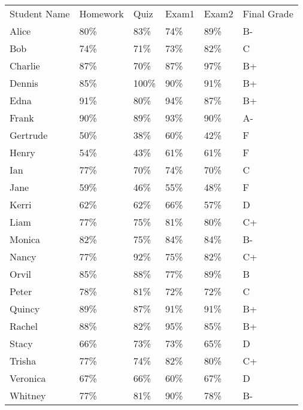 \documentclass{article}
\begin{document}
\begin{tabular}{l | l | l | l | l | l}
Student Name & Homework & Quiz & Exam1 & Exam2 & Final Grade \\ 
Alice & 80\% & 83\% & 74\% & 89\% & B- \\ 
Bob & 74\% & 71\% & 73\% & 82\% & C \\ 
Charlie & 87\% & 70\% & 87\% & 97\% & B+ \\ 
Dennis & 85\% & 100\% & 90\% & 91\% & B+ \\ 
Edna & 91\% & 80\% & 94\% & 87\% & B+ \\ 
Frank & 90\% & 89\% & 93\% & 90\% & A- \\ 
Gertrude & 50\% & 38\% & 60\% & 42\% & F \\ 
Henry & 54\% & 43\% & 61\% & 61\% & F \\ 
Ian & 77\% & 70\% & 74\% & 70\% & C \\ 
Jane & 59\% & 46\% & 55\% & 48\% & F \\ 
Kerri & 62\% & 62\% & 66\% & 57\% & D \\ 
Liam & 77\% & 75\% & 81\% & 80\% & C+ \\ 
Monica & 82\% & 75\% & 84\% & 84\% & B- \\ 
Nancy & 77\% & 92\% & 75\% & 82\% & C+ \\ 
Orvil & 85\% & 88\% & 77\% & 89\% & B \\ 
Peter & 78\% & 81\% & 72\% & 72\% & C \\ 
Quincy & 89\% & 87\% & 91\% & 91\% & B+ \\ 
Rachel & 88\% & 82\% & 95\% & 85\% & B+ \\ 
Stacy & 66\% & 73\% & 73\% & 65\% & D \\ 
Trisha & 77\% & 74\% & 82\% & 80\% & C+ \\ 
Veronica & 67\% & 66\% & 60\% & 67\% & D \\ 
Whitney & 77\% & 81\% & 90\% & 78\% & B- \\ 
\end{tabular}
\end{document}
